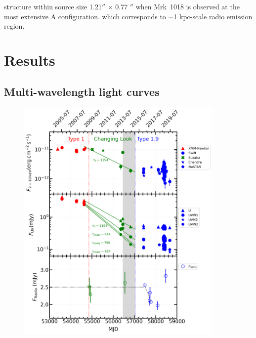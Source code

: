 \documentclass[twocolumn]{aastex63}
\begin{document}
structure within source size 1.21$''$ $\times$ 0.77 $''$ when Mrk~1018 is observed at the most extensive A configuration. which corresponds to $\sim$1 kpc-scale radio emission region.





\section{Results}
\label{sec:result}

\subsection{Multi-wavelength light curves}
\label{sec:multi-lc}

\begin{figure}
\centering
	\includegraphics[width=0.9\textwidth]{./pic/subplots-xrt_uvot-radio-second.png}

\end{figure}
\end{document}
